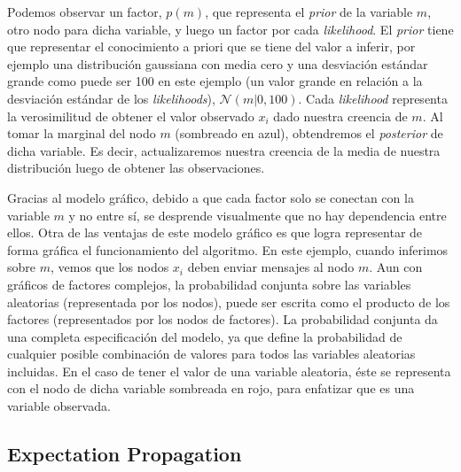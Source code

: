 \documentclass[11pt,twoside,spanish]{report} %
\begin{document}
Podemos observar un factor, $p(m)$, que representa el \textit{prior} de la variable  $m$, otro nodo para dicha variable, y luego un factor por cada \emph{likelihood}.
El \textit{prior} tiene que representar el conocimiento a priori que se tiene del valor a inferir, por ejemplo una distribuci\'on gaussiana con media cero y una desviaci\'on est\'andar grande como puede ser 100 en este ejemplo (un valor grande en relaci\'on a la desviaci\'on est\'andar de los \emph{likelihoods}), $\mathcal{N}(m|0,100)$. 
Cada \emph{likelihood} representa la verosimilitud de obtener el valor observado $x_i$ dado nuestra creencia de $m$.
Al tomar la marginal del nodo $m$ (sombreado en azul), obtendremos el \textit{posterior} de dicha variable.
Es decir, actualizaremos nuestra creencia de la media de nuestra distribuci\'on luego de obtener las observaciones.

Gracias al modelo gr\'afico, debido a que cada factor solo se conectan con la variable $m$ y no entre s\'i, se desprende visualmente que no hay dependencia entre ellos.
Otra de las ventajas de este modelo gr\'afico es que logra representar de forma gr\'afica el funcionamiento del algoritmo.
En este ejemplo, cuando inferimos sobre $m$, vemos que los nodos $x_i$ deben enviar mensajes al nodo $m$.
Aun con gr\'aficos de factores complejos, la probabilidad conjunta sobre las variables aleatorias (representada por los nodos), puede ser escrita como el producto de los factores (representados por los nodos de factores).
La probabilidad conjunta da una completa especificaci\'on del modelo, ya que define la probabilidad de cualquier posible combinaci\'on de valores para todos las variables aleatorias incluidas.
En el caso de tener el valor de una variable aleatoria, \'este se representa con el nodo de dicha variable sombreada en rojo, para enfatizar que es una variable observada.


\subsection{Expectation Propagation}
\end{document}
